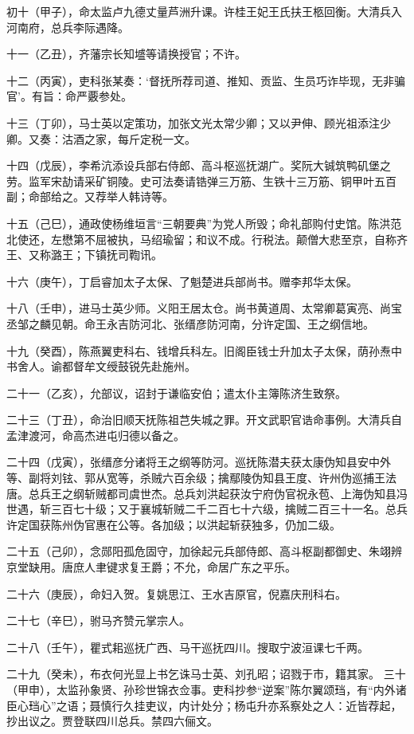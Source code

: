 \documentclass[]{article}
\begin{document}
初十（甲子），命太监卢九德丈量芦洲升课。许桂王妃王氏扶王柩回衡。大清兵入河南府，总兵李际遇降。

十一（乙丑），齐藩宗长知墭等请换授官；不许。

十二（丙寅），吏科张某奏：`督抚所荐司道、推知、贡监、生员巧诈毕现，无非骗官'。有旨：命严覈参处。

十三（丁卯），马士英以定策功，加张文光太常少卿；又以尹伸、顾光祖添注少卿。又奏：沽酒之家，每斤定税一文。

十四（戊辰），李希沆添设兵部右侍郎、高斗枢巡抚湖广。奖阮大铖筑鸭矶堡之劳。监军宋劼请采矿铜陵。史可法奏请锆弹三万筋、生铁十三万筋、铜甲叶五百副；命部给之。又荐举人韩诗等。

十五（己巳），通政使杨维垣言``三朝要典''为党人所毁；命礼部购付史馆。陈洪范北使还，左懋第不屈被执，马绍瑜留；和议不成。行税法。颠僧大悲至京，自称齐王、又称潞王；下镇抚司鞫讯。

十六（庚午），丁启睿加太子太保、了魁楚进兵部尚书。赠李邦华太保。

十八（壬申），进马士英少师。义阳王居太仓。尚书黄道周、太常卿葛寅亮、尚宝丞邹之麟见朝。命王永吉防河北、张缙彦防河南，分许定国、王之纲信地。

十九（癸酉），陈燕翼吏科右、钱增兵科左。旧阁臣钱士升加太子太保，荫孙焘中书舍人。谕都督牟文绶鼓锐先赴施州。

二十一（乙亥），允部议，诏封于谦临安伯；遣太仆主簿陈济生致祭。

二十三（丁丑），命治旧顺天抚陈祖芑失城之罪。开文武职官诰命事例。大清兵自孟津渡河，命高杰进屯归德以备之。

二十四（戊寅），张缙彦分诸将王之纲等防河。巡抚陈潜夫获太康伪知县安中外等、副将刘铉、郭从宽等，杀贼六百余级；擒鄢陵伪知县王度、许州伪巡捕王法唐。总兵王之纲斩贼都司虞世杰。总兵刘洪起获汝宁府伪官祝永苞、上海伪知县冯世遇，斩三百七十级；又于襄城斩贼二千二百七十六级，擒贼二百三十一名。总兵许定国获陈州伪官惠在公等。各加级；以洪起斩获独多，仍加二级。

二十五（己卯），念郧阳孤危固守，加徐起元兵部侍郎、高斗枢副都御史、朱翊辨京堂缺用。唐庶人聿键求复王爵；不允，命居广东之平乐。

二十六（庚辰），命妇入贺。复姚思江、王水吉原官，倪嘉庆刑科右。

二十七（辛巳），驸马齐赞元掌宗人。

二十八（壬午），瞿式耜巡抚广西、马干巡抚四川。搜取宁波洹课七千两。

二十九（癸未），布衣何光显上书乞诛马士英、刘孔昭；诏戮于市，籍其家。
三十（甲申），太监孙象贤、孙珍世锦衣佥事。吏科抄参``逆案''陈尔翼颂珰，有``内外诸臣心珰心''之语；聂慎行久挂吏议，内计处分；杨屯升亦系察处之人：近皆荐起，抄出议之。贾登联四川总兵。禁四六俪文。
\end{document}

